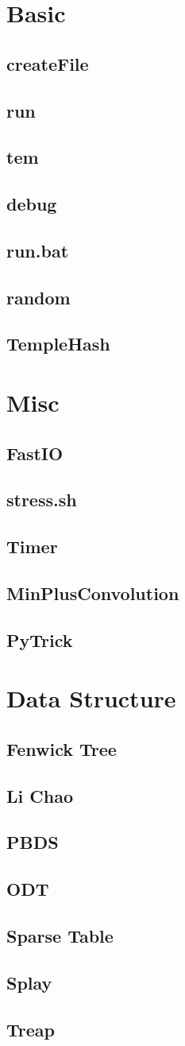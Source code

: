 \documentclass[a4paper,10pt,twocolumn,oneside]{article}
\begin{document}
\pagestyle{fancy}
\fancyfoot{}
\fancyhead[R]{\thepage}
\renewcommand{\headrulewidth}{0.4pt}
\renewcommand{\contentsname}{Contents} 

\scriptsize
\vspace{-2em}
\tableofcontents
\vspace{-1em}



\newcommand{\includecode}[2]{
  \subsection{#1}
  \vspace{-0.8em}
  
  \vspace{-1.2em}
}

\newcommand{\includetex}[2]{
  \subsection{#1}
  
  \vspace{-1.2em}
}

\newcommand{\sectiontitle}[1]{
  \section{#1}
  \vspace{-0.5em}
}



\sectiontitle{Basic}
\includecode{createFile}{../code/Basic/createFile}
\includecode{run}{../code/Basic/run}
\includecode{tem}{../code/Basic/tem.cpp}
\includecode{debug}{../code/Basic/debug.cpp}
\includecode{run.bat}{../code/Basic/run.bat}
\includecode{random}{../code/Basic/random.cpp}
\includecode{TempleHash}{../code/Basic/TempleHash.sh}

\sectiontitle{Misc}
\includecode{FastIO}{../code/Misc/FastIO.cpp}
\includecode{stress.sh}{../code/Misc/stress.sh}
\includecode{Timer}{../code/Misc/Timer.cpp}
\includecode{MinPlusConvolution}{../code/Misc/Min_Plus_Convolution.cpp}
\includecode{PyTrick}{../code/Misc/PyTrick.py}

\sectiontitle{Data Structure}
\includecode{Fenwick Tree}{../code/DataStructure/FenwickTree.cpp}
\includecode{Li Chao}{../code/DataStructure/LiChao.cpp}
\includecode{PBDS}{../code/DataStructure/PBDS.cpp}
\includecode{ODT}{../code/DataStructure/ODT.cpp}
\includecode{Sparse Table}{../code/DataStructure/SparseTable.cpp}
\includecode{Splay}{../code/DataStructure/SplayTree.cpp}
\includecode{Treap}{../code/DataStructure/Treap.cpp}
\end{document}
